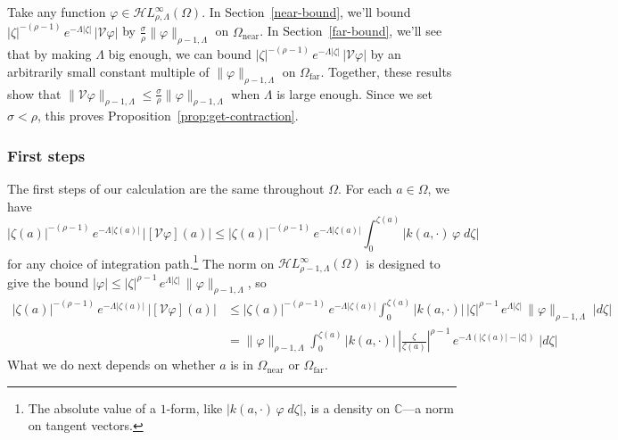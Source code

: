 \documentclass{article}
\theoremstyle{plain}
\newcommand{\C}{\mathbb{C}}
\newcommand{\singexp}[2]{\mathcal{H}L^\infty_{#1, #2}}
\newcommand{\volterra}{\mathcal{V}}
\newcommand{\domain}{\Omega}
\newcommand{\near}{\Omega_\text{near}}
\newcommand{\far}{\Omega_\text{far}}
\begin{document}
Take any function $\varphi \in \singexp{\rho}{\Lambda}(\domain)$. In Section~\ref{near-bound}, we'll bound $|\zeta|^{-(\rho-1)}\,e^{-\Lambda|\zeta|}\,|\volterra\varphi|$ by $\tfrac{\sigma}{\rho} \|\varphi\|_{\rho-1, \Lambda}$ on $\near$. In Section~\ref{far-bound}, we'll see that by making $\Lambda$ big enough, we can bound $|\zeta|^{-(\rho-1)}\,e^{-\Lambda|\zeta|}\,|\volterra\varphi|$ by an arbitrarily small constant multiple of $\|\varphi\|_{\rho-1, \Lambda}$ on $\far$. Together, these results show that $\|\volterra \varphi\|_{\rho-1, \Lambda} \le \tfrac{\sigma}{\rho} \|\varphi\|_{\rho-1, \Lambda}$ when $\Lambda$ is large enough. Since we set $\sigma < \rho$, this proves Proposition~\ref{prop:get-contraction}.
\subsubsection{First steps}\label{first-steps}
The first steps of our calculation are the same throughout $\domain$. For each $a \in \domain$, we have
\[ |\zeta(a)|^{-(\rho-1)}\,e^{-\Lambda|\zeta(a)|}\,|[\volterra\varphi](a)| \le |\zeta(a)|^{-(\rho-1)}\,e^{-\Lambda|\zeta(a)|} \int_0^{\zeta(a)} |k(a, \cdot)\,\varphi\;d\zeta| \]
for any choice of integration path.\footnote{The absolute value of a $1$-form, like $|k(a, \cdot)\,\varphi\;d\zeta|$, is a density on $\C$---a norm on tangent vectors.} The norm on $\singexp{\rho-1}{\Lambda}(\domain)$ is designed to give the bound $|\varphi| \le |\zeta|^{\rho-1}\,e^{\Lambda |\zeta|}\,\|\varphi\|_{\rho-1, \Lambda}$, so
\begin{align*}
|\zeta(a)|^{-(\rho-1)}\,e^{-\Lambda|\zeta(a)|}\,|[\volterra\varphi](a)| & \le |\zeta(a)|^{-(\rho-1)}\,e^{-\Lambda|\zeta(a)|} \int_0^{\zeta(a)} |k(a, \cdot)|\,|\zeta|^{\rho-1}\,e^{\Lambda |\zeta|}\,\|\varphi\|_{\rho-1, \Lambda}\;|d\zeta| \\
& = \|\varphi\|_{\rho-1, \Lambda} \int_0^{\zeta(a)} |k(a, \cdot)|\,\left|\frac{\zeta}{\zeta(a)}\right|^{\rho-1}\,e^{-\Lambda(|\zeta(a)| - |\zeta|)}\;|d\zeta|
\end{align*}
What we do next depends on whether $a$ is in $\near$ or $\far$.
\end{document}
